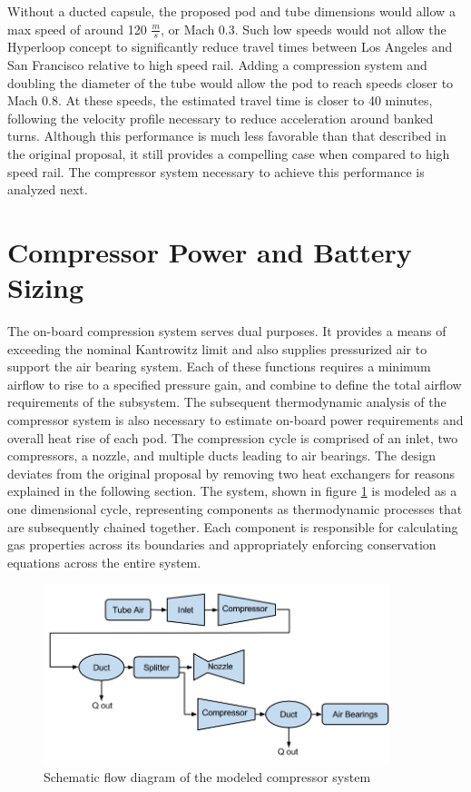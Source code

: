 \documentclass[heading.tex]{subfiles}
\begin{document}
Without a ducted capsule, the proposed pod and tube dimensions would allow a max speed of around 120 $\frac{m}{s}$, or Mach 0.3.
Such low speeds would not allow the Hyperloop concept to significantly reduce travel times between Los Angeles
and San Francisco relative to high speed rail.
Adding a compression system and doubling the diameter of the tube would allow the pod to reach speeds closer to Mach 0.8.
At these speeds, the estimated travel time is closer to 40 minutes, following the velocity profile
necessary to reduce acceleration around banked turns.
Although this performance is much less favorable than that described in the original proposal,
it still provides a compelling case when compared to high speed rail. 
The compressor system necessary to achieve this performance is analyzed next.

\section{Compressor Power and Battery Sizing}
\label{sec:compressor-and-battery}

The on-board compression system serves dual purposes.
It provides a means of exceeding the nominal Kantrowitz limit and also supplies pressurized air to support the air bearing system.
Each of these functions requires a minimum airflow to rise to a specified pressure gain,
and combine to define the total airflow requirements of the subsystem.
The subsequent thermodynamic analysis of the compressor system is also necessary to
estimate on-board power requirements and overall heat rise of each pod.
The compression cycle is comprised of an inlet, two compressors, a nozzle, and multiple ducts leading to air bearings.
The design deviates from the original proposal by removing two heat exchangers for reasons explained in the following section.
The system, shown in figure \ref{f:comp} is modeled as a one dimensional cycle,
representing components as thermodynamic processes that are subsequently chained together.
Each component is responsible for calculating gas properties across its boundaries
and appropriately enforcing conservation equations across the entire system.

\begin{figure}[hbtp]
\centering
\includegraphics[width=0.9\textwidth]{images/compressor_schematic.png}
\caption{Schematic flow diagram of the modeled compressor system}
\label{f:comp}
\end{figure}
\end{document}
